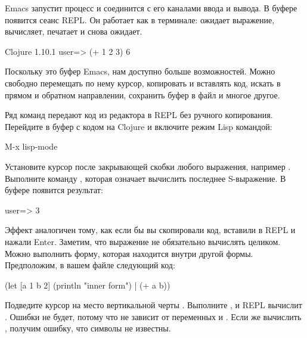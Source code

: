Emacs запустит процесс и соединится с его каналами ввода и вывода. В буфере  появится сеанс REPL. Он работает как в терминале: ожидает выражение, вычисляет, печатает и снова ожидает.

\begin{english}
  \begin{clojure}
Clojure 1.10.1
user=> (+ 1 2 3)
6
  \end{clojure}
\end{english}

Поскольку это буфер Emacs, нам доступно больше возможностей. Можно свободно перемещать по нему курсор, копировать и вставлять код, искать в прямом и обратном направлении, сохранить буфер в файл и многое другое.

Ряд команд передают код из редактора в REPL без ручного копирования. Перейдите в буфер с кодом на Clojure и включите режим Lisp командой:

\begin{english}
  \begin{text}
M-x lisp-mode
  \end{text}
\end{english}

Установите курсор после закрывающей скобки любого выражения, например . Выполните команду , которая означает вычислить последнее S-выражение. В буфере  появится результат:

\begin{english}
  \begin{text}
user=> 3
  \end{text}
\end{english}

Эффект аналогичен тому, как если бы вы скопировали код, вставили в REPL и нажали Enter. Заметим, что выражение не обязательно вычислять целиком. Можно выполнить форму, которая находится внутри другой формы. Предположим, в вашем файле следующий код:

\begin{english}
  \begin{clojure/lines}
(let [a 1 b 2]
  (println "inner form") |
  (+ a b))
  \end{clojure/lines}
\end{english}

Подведите курсор на место вертикальной черты . Выполните , и REPL вычислит . Ошибки не будет, потому что  не зависит от переменных  и . Если же вычислить , получим ошибку, что символы не известны.

